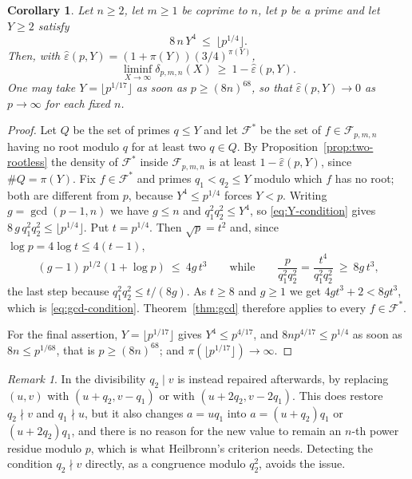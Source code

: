 \documentclass[11pt,reqno]{amsart}
\theoremstyle{plain}
\newtheorem{corollary}[theorem]{Corollary}
\theoremstyle{definition}
\theoremstyle{remark}
\newtheorem{remark}[theorem]{Remark}
\begin{document}
\begin{corollary}\label{cor:gcd-density}
Let $n\ge2$, let $m\ge1$ be coprime to $n$, let $p$ be a prime and let $Y\ge2$ satisfy
\begin{equation}\label{eq:Y-condition}
  8\,n\,Y^{4}\ \le\ \lfloor p^{1/4}\rfloor .
\end{equation}
Then, with $\hat\varepsilon(p,Y)=(1+\pi(Y))(3/4)^{\pi(Y)}$,
\[
  \liminf_{X\to\infty}\delta_{p,m,n}(X)\ \ge\ 1-\hat\varepsilon(p,Y).
\]
One may take $Y=\lfloor p^{1/17}\rfloor$ as soon as $p\ge(8n)^{68}$, so that
$\hat\varepsilon(p,Y)\to0$ as $p\to\infty$ for each fixed $n$.
\end{corollary}

\begin{proof}
Let $Q$ be the set of primes $q\le Y$ and let $\mathcal F^{*}$ be the set of
$f\in\mathcal F_{p,m,n}$ having no root modulo $q$ for at least two $q\in Q$. By
Proposition~\ref{prop:two-rootless} the density of $\mathcal F^{*}$ inside $\mathcal F_{p,m,n}$ is
at least $1-\hat\varepsilon(p,Y)$, since $\#Q=\pi(Y)$. Fix $f\in\mathcal F^{*}$ and primes
$q_1<q_2\le Y$ modulo which $f$ has no root; both are different from $p$, because
$Y^{4}\le p^{1/4}$ forces $Y<p$. Writing $g=\gcd(p-1,n)$ we have $g\le n$ and
$q_1^{2}q_2^{2}\le Y^{4}$, so \eqref{eq:Y-condition} gives
$8\,g\,q_1^{2}q_2^{2}\le\lfloor p^{1/4}\rfloor$. Put $t=p^{1/4}$. Then $\sqrt p=t^{2}$ and, since
$\log p=4\log t\le 4(t-1)$,
\[
  (g-1)\,p^{1/2}(1+\log p)\ \le\ 4g\,t^{3}
  \qquad\text{while}\qquad
  \frac{p}{q_1^{2}q_2^{2}}=\frac{t^{4}}{q_1^{2}q_2^{2}}\ \ge\ 8g\,t^{3},
\]
the last step because $q_1^2q_2^2\le t/(8g)$. As $t\ge8$ and $g\ge1$ we get $4gt^{3}+2<8gt^{3}$,
which is \eqref{eq:gcd-condition}. Theorem~\ref{thm:gcd} therefore applies to every
$f\in\mathcal F^{*}$.

For the final assertion, $Y=\lfloor p^{1/17}\rfloor$ gives $Y^{4}\le p^{4/17}$, and
$8np^{4/17}\le p^{1/4}$ as soon as $8n\le p^{1/68}$, that is $p\ge(8n)^{68}$; and
$\pi(\lfloor p^{1/17}\rfloor)\to\infty$.
\end{proof}

\begin{remark}
In \cite{HMT} the divisibility $q_2\mid v$ is instead repaired afterwards, by replacing
$(u,v)$ with $(u+q_2,v-q_1)$ or with $(u+2q_2,v-2q_1)$. This does restore $q_2\nmid v$ and
$q_1\nmid u$, but it also changes $a=uq_1$ into $a=(u+q_2)q_1$ or $(u+2q_2)q_1$, and there is no
reason for the new value to remain an $n$-th power residue modulo $p$, which is what Heilbronn's
criterion needs. Detecting the condition $q_2\nmid v$ directly, as a congruence modulo $q_2^{2}$,
avoids the issue.
\end{remark}
\end{document}
